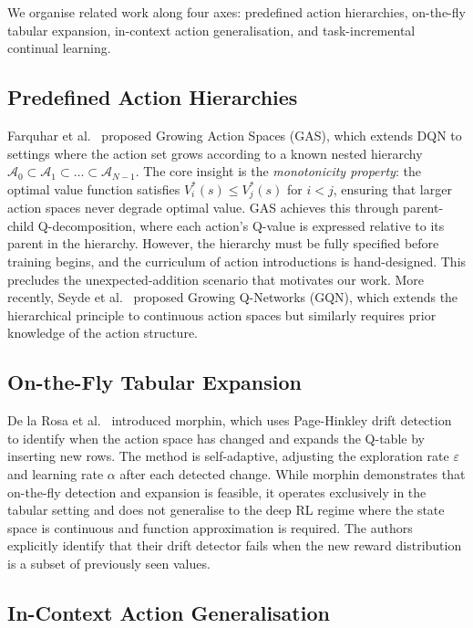 \documentclass{article}
\begin{document}
We organise related work along four axes: predefined action hierarchies, on-the-fly tabular expansion, in-context action generalisation, and task-incremental continual learning.

\subsection{Predefined Action Hierarchies}

Farquhar et al.~\cite{farquhar2020growing} proposed Growing Action Spaces (GAS), which extends DQN to settings where the action set grows according to a known nested hierarchy $\mathcal{A}_0 \subset \mathcal{A}_1 \subset \dots \subset \mathcal{A}_{N-1}$. The core insight is the \emph{monotonicity property}: the optimal value function satisfies $V^*_i(s) \leq V^*_j(s)$ for $i < j$, ensuring that larger action spaces never degrade optimal value. GAS achieves this through parent-child Q-decomposition, where each action's Q-value is expressed relative to its parent in the hierarchy. However, the hierarchy must be fully specified before training begins, and the curriculum of action introductions is hand-designed. This precludes the unexpected-addition scenario that motivates our work. More recently, Seyde et al.~\cite{seyde2024growing} proposed Growing Q-Networks (GQN), which extends the hierarchical principle to continuous action spaces but similarly requires prior knowledge of the action structure.

\subsection{On-the-Fly Tabular Expansion}

De la Rosa et al.~\cite{delarosa2026morphin} introduced morphin, which uses Page-Hinkley drift detection to identify when the action space has changed and expands the Q-table by inserting new rows. The method is self-adaptive, adjusting the exploration rate $\varepsilon$ and learning rate $\alpha$ after each detected change. While morphin demonstrates that on-the-fly detection and expansion is feasible, it operates exclusively in the tabular setting and does not generalise to the deep RL regime where the state space is continuous and function approximation is required. The authors explicitly identify that their drift detector fails when the new reward distribution is a subset of previously seen values.

\subsection{In-Context Action Generalisation}
\end{document}
